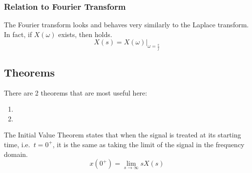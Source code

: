 \subsubsection{Relation to Fourier Transform}\label{subsubsec:Fourier_Transform_Relation}
The Fourier transform looks and behaves very similarly to the Laplace transform.
In fact, if $X(\omega)$ exists, then  holds.
\begin{equation}\label{eq:Fourier_Laplace_Transform_Relation}
  X(s) = X(\omega) \vert_{\omega = \frac{s}{j}}
\end{equation}

\subsection{Theorems}\label{subsec:Laplace_Theorems}
There are 2 theorems that are most useful here:
\begin{enumerate}[noitemsep]
\item {}
\item {}
\end{enumerate}

\begin{theorem}\label{thm:Laplace_Initial_Value_Theorem}
  The Initial Value Theorem states that when the signal is treated at its starting time, i.e.\ $t=0^{+}$, it is the same as taking the limit of the signal in the frequency domain.
  \begin{equation*}
    x(0^{+}) = \lim\limits_{s \rightarrow \infty} s X(s)
  \end{equation*}
\end{theorem}


